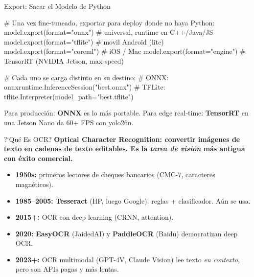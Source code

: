 \begin{frame}{Export: Sacar el Modelo de Python}
  \vspace{-4pt}
  \begin{pyblock}
# Una vez fine-tuneado, exportar para deploy donde no haya Python:
model.export(format="onnx")        # universal, runtime en C++/Java/JS
model.export(format="tflite")      # movil Android (lite)
model.export(format="coreml")      # iOS / Mac
model.export(format="engine")      # TensorRT (NVIDIA Jetson, max speed)

# Cada uno se carga distinto en su destino:
#   ONNX:    onnxruntime.InferenceSession("best.onnx")
#   TFLite:  tflite.Interpreter(model_path="best.tflite")
  \end{pyblock}

  \vspace{4pt}
  {\scriptsize\color{textMuted}
    \faLightbulb\hspace{4pt} Para producci\'on: \textbf{ONNX} es lo m\'as
    portable. Para edge real-time: \textbf{TensorRT} en una Jetson Nano da
    60+ FPS con yolo26n.}
\end{frame}


\begin{frame}[shrink]{?`Qu\'e Es OCR?}
  \vspace{6pt}
  {\footnotesize\color{arcaDark}\bfseries
    \textbf{Optical Character Recognition}: convertir im\'agenes de
    texto en cadenas de texto editables. Es la \emph{tarea de visi\'on}
    m\'as antigua con \'exito comercial.}

  \vspace{14pt}
  {\footnotesize
  \begin{itemize}\setlength{\itemsep}{6pt}
    \item[{\color{arcaRed}\scriptsize\faArrowRight}]
      \textbf{1950s:} primeros lectores de cheques bancarios (CMC-7,
      caracteres magn\'eticos).
    \item[{\color{arcaRed}\scriptsize\faArrowRight}]
      \textbf{1985--2005:} \textbf{Tesseract} (HP, luego Google):
      reglas + clasificador. A\'un se usa.
    \item[{\color{arcaRed}\scriptsize\faArrowRight}]
      \textbf{2015+:} OCR con deep learning (CRNN, attention).
    \item[{\color{arcaRed}\scriptsize\faArrowRight}]
      \textbf{2020:} \textbf{EasyOCR} (JaidedAI) y \textbf{PaddleOCR}
      (Baidu) democratizan deep OCR.
    \item[{\color{codeGreen}\scriptsize\faArrowRight}]
      \textbf{2023+:} OCR multimodal (GPT-4V, Claude Vision) lee texto
      \emph{en contexto}, pero son APIs pagas y m\'as lentas.
  \end{itemize}
  }
\end{frame}

